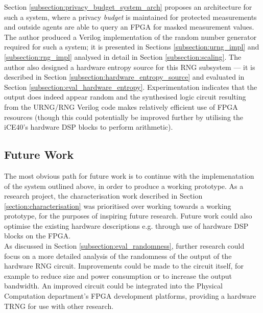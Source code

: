 \documentclass[12pt]{article}
\begin{document}
  Section \ref{subsection:privacy_budget_system_arch} proposes an architecture for such a system, where a privacy \textit{budget} is maintained for protected measurements and outside agents are able to query an FPGA for masked measurement values. The author produced a Verilog implementation of the random number generator required for such a system; it is presented in Sections \ref{subsection:urng_impl} and \ref{subsection:rng_impl} analysed in detail in Section \ref{subsection:scaling}. The author also designed a hardware entropy source for this RNG subsystem --- it is described in Section \ref{subsection:hardware_entropy_source} and evaluated in Section \ref{subsection:eval_hardware_entropy}. Experimentation indicates that the output does indeed appear random and the synthesised logic circuit resulting from the URNG/RNG Verilog code makes relatively efficient use of FPGA resources (though this could potentially be improved further by utilising the iCE40's hardware DSP blocks to perform arithmetic).


  \subsection{Future Work}
    The most obvious path for future work is to continue with the implemenatation of the system outlined above, in order to produce a working prototype. As a research project, the characterisation work described in Section \ref{section:characterisation} was prioritised over working towards a working prototype, for the purposes of inspiring future research. Future work could also optimise the existing hardware descriptions e.g. through use of hardware DSP blocks on the FPGA.\\

    As discussed in Section \ref{subsection:eval_randomness}, further research could focus on a more detailed analysis of the randomness of the output of the hardware RNG circuit. Improvements could be made to the circuit itself, for example to reduce size and power consumption or to increase the output bandwidth. An improved circuit could be integrated into the Physical Computation department's FPGA development platforms, providing a hardware TRNG for use with other research.\\
\end{document}
